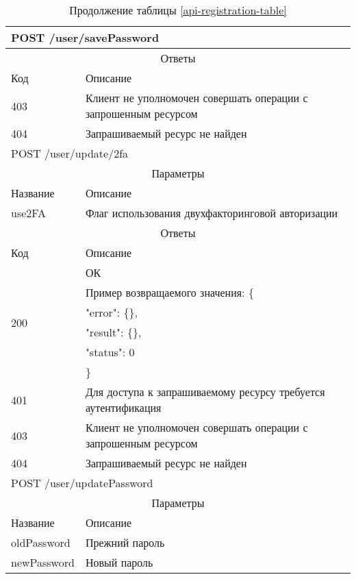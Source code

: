 \begin{table}[H]
  \caption*{Продолжение таблицы \ref{api-registration-table}}
  \begin{tabular}{|p{6cm}|p{10cm}|}
  \hline \multicolumn{2}{|l|}{POST /user/savePassword} \\
  \hline \multicolumn{2}{|c|}{Ответы} \\
  \hline Код & Описание \\
  \hline 403 & Клиент не уполномочен совершать операции с запрошенным ресурсом \\
  \hline 404 & Запрашиваемый ресурс не найден \\
  \hline \multicolumn{2}{|l|}{POST /user/update/2fa} \\
  \hline \multicolumn{2}{|c|}{Параметры} \\
  \hline Название & Описание \\
  \hline use2FA & Флаг использования двухфакторинговой авторизации \\
  \hline \multicolumn{2}{|c|}{Ответы} \\
  \hline Код & Описание \\
  \hline \multirow{6}{=}{200} & ОК \\
   & Пример возвращаемого значения: \{ \\
   & "error": \{\}, \\
   & "result": \{\}, \\
   & "status": 0 \\
   & \} \\
  \hline 401 & Для доступа к запрашиваемому ресурсу требуется аутентификация \\
  \hline 403 & Клиент не уполномочен совершать операции с запрошенным ресурсом \\
  \hline 404 & Запрашиваемый ресурс не найден \\
  \hline \multicolumn{2}{|l|}{POST /user/updatePassword} \\
  \hline \multicolumn{2}{|c|}{Параметры} \\
  \hline Название & Описание \\
  \hline oldPassword & Прежний пароль \\
  \hline newPassword & Новый пароль \\
  \hline
  \end{tabular}
\end{table}
